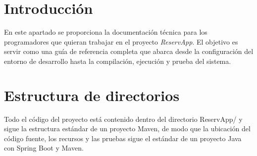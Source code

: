 
\section{Introducción}
En este apartado se proporciona la documentación técnica para los programadores que quieran trabajar en el proyecto \textit{ReservApp}. El objetivo es servir como una guía de referencia completa que abarca desde la configuración del entorno de desarrollo hasta la compilación, ejecución y prueba del sistema.

\section{Estructura de directorios}
Todo el código del proyecto está contenido dentro del directorio ReservApp/ y sigue la estructura estándar de un proyecto Maven, de modo que la ubicación del código fuente, los recursos y las pruebas sigue el estándar de un proyecto Java con Spring Boot y Maven.


